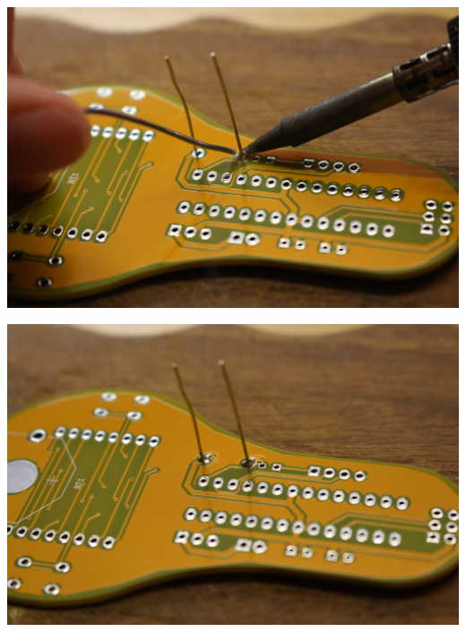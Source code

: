 \documentclass{article}
\begin{document}
\begin{minipage}[b]{0.5\textwidth}
	\includegraphics[width=\textwidth]{Bilder/IMG_5542.JPG}
	\label{fig:}
\end{minipage}
\begin{minipage}[b]{0.5\textwidth}
	\includegraphics[width=\textwidth]{Bilder/IMG_5543.JPG}
	\label{fig:}
\end{minipage}
\end{document}
